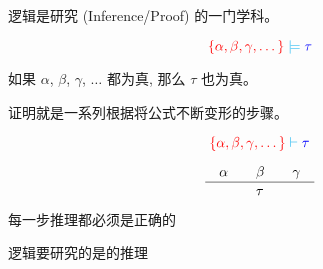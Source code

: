 
\begin{frame}{}
  \begin{center}
    逻辑是研究 (Inference/Proof) 的一门学科。

    \vspace{0.30cm}

    \vspace{0.30cm}
  \end{center}
\end{frame}

\begin{frame}{}
  \[
    \textcolor{red}{\{\alpha, \beta, \gamma, \dots\}} \;\textcolor{cyan}{\models}\; \textcolor{blue}{\tau}
  \]

  \vspace{0.50cm}
  \begin{center}
     如果 $\alpha$, $\beta$, $\gamma$, $\dots$ 都为真,
    那么 $\tau$ 也为真。
  \end{center}
\end{frame}

\begin{frame}{}
  \begin{center}
    证明就是一系列根据将公式不断变形的步骤。

    \[
      \textcolor{red}{\{\alpha, \beta, \gamma, \dots\}} \;\textcolor{cyan}{\vdash}\; \textcolor{blue}{\tau}
    \]

    \[
      \frac{\quad\alpha \qquad \beta \qquad \gamma\quad}{\quad\tau\quad}
    \]

    \pause
    \vspace{0.50cm}
    每一步推理都必须是正确的

    \pause
    \vspace{0.60cm}
  \end{center}
\end{frame}

\begin{frame}{}
  \begin{center}

    \vspace{0.30cm}
    逻辑要研究的是的推理
  \end{center}
\end{frame}

